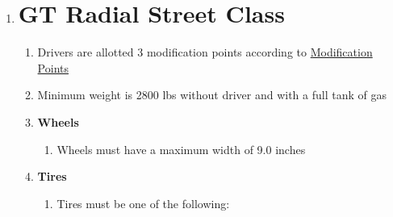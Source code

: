 \documentclass{article}
\newenvironment{legallist}{
    \begin{enumerate}[label*=\arabic*.]
}{
    \end{enumerate}
}
\begin{document}
\begin{legallist}
\begin{legallist}
				\item \textbf{Misc}
				\begin{legallist}
					\item OEM-style, off-the-shelf, non-adjustable, and non-rebuildable dampers with unaltered valving are allowed
					\item Braking upgrades are allowed
					\item Replacing OEM parts with newer/older OEM parts is allowed (e.g.\ dampers, sway bars, etc).
					\item No lightweight replacement parts are allowed (e.g.\ battery, lighter than OEM trunk) or removal of parts allowed. 
					\item Removal of spare tire, floor mats, and tools is allowed.
					\item Non-OEM cat-back exhaust with a weight greater than 32 lbs is allowed (no removal of any catalyst)
				\end{legallist}
								
			\end{legallist}

            \newpage
						
			\item \section*{GT Radial Street Class}
						    
			\begin{legallist}
				\item Drivers are allotted 3 modification points according to \hyperref[sec:mods]{Modification Points}
				\item Minimum weight is 2800 lbs without driver and with a full tank of gas
								
				\item \textbf{Wheels}
				\begin{legallist}
					\item Wheels must have a maximum width of 9.0 inches
				\end{legallist}
								
				\item \textbf{Tires}
				\begin{legallist}
					\item Tires must be one of the following:
										

\end{legallist}
\end{legallist}
\end{legallist}
\end{document}
